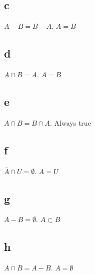 \documentclass[12pt]{article}
\begin{document}
\subsection*{c}
\(A - B = B - A\). \(A = B\)
\subsection*{d}
\(A \cap B = A\). \(A = B\)
\subsection*{e}
\(A \cap B = B \cap A\). Always true
\subsection*{f}
\(\bar{A} \cap U = \emptyset\). \(A = U\)
\subsection*{g}
\(A - B = \emptyset\). \(A \subset B\)
\subsection*{h}
\(A \cap B = A - B\). \(A = \emptyset\)
\end{document}
